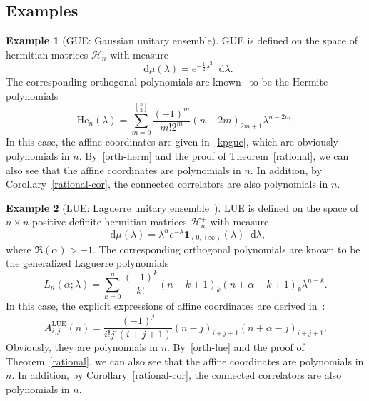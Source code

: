 \documentclass[a4paper]{article}
\theoremstyle{plain}
\theoremstyle{definition}
\newtheorem{example}{Example}
\newcommand{\dif}{\mathop{}\!\mathrm{d}}
\newcommand{\He}{\mathrm{He}}
\begin{document}
\subsection{Examples}

\begin{example}[GUE: Gaussian unitary ensemble] \label{gue}
	GUE is defined on the space of hermitian matrices $\mathcal{H}_n$ with measure 
	\begin{equation}
		\dif\mu(\lambda)=e^{-\frac{1}{2}\lambda^2}\dif\lambda.
	\end{equation}
	The corresponding orthogonal polynomials are known~\cite{Szego} to be the Hermite polynomials
	\begin{equation} \label{orth-herm}
		\He_n(\lambda)=\sum_{m=0}^{[\frac{n}{2}]}\frac{(-1)^m}{m!2^m}(n-2m)_{2m+1}\lambda^{n-2m}.
	\end{equation}
	In this case, the affine coordinates are given in~\eqref{kpgue}, which are obviously polynomials in $n$. By~\eqref{orth-herm} and the proof of Theorem~\ref{rational}, we can also see that the affine coordinates are polynomials in $n$. In addition, by Corollary~\ref{rational-cor}, the connected correlators are also polynomials in $n$.
\end{example}

\begin{example}[LUE: Laguerre unitary ensemble~\cite{Lag,Sonine,Mehta,Szego,Laguerre,LUE}] \label{lue}
	LUE is defined on the space of $n\times n$ positive definite hermitian matrices $\mathcal{H}_n^+$ with measure
	\begin{equation}
		\dif\mu(\lambda)=\lambda^\alpha e^{-\lambda}\mathbf{1}_{(0,+\infty)}(\lambda)\dif \lambda,
	\end{equation}
	where $\Re(\alpha)>-1$. The corresponding orthogonal polynomials are known to be the generalized Laguerre polynomials
	\begin{equation} \label{orth-lue}
		L_n(\alpha;\lambda)=\sum_{k=0}^n\frac{(-1)^k}{k!}(n-k+1)_k(n+\alpha-k+1)_k\lambda^{n-k}.
	\end{equation}
	In this case, the explicit expressions of affine coordinates are derived in~\cite{ZhouGro,LUE}:
	\begin{equation}
		A_{i,j}^{\mathrm{LUE}}(n)=\frac{(-1)^j}{i!j!(i+j+1)}(n-j)_{i+j+1}(n+\alpha-j)_{i+j+1}.
	\end{equation}
	Obviously, they are polynomials in $n$. By~\eqref{orth-lue} and the proof of Theorem~\ref{rational}, we can also see that the affine coordinates are polynomials in $n$. In addition, by Corollary~\ref{rational-cor}, the connected correlators are also polynomials in $n$.
\end{example}
\end{document}
